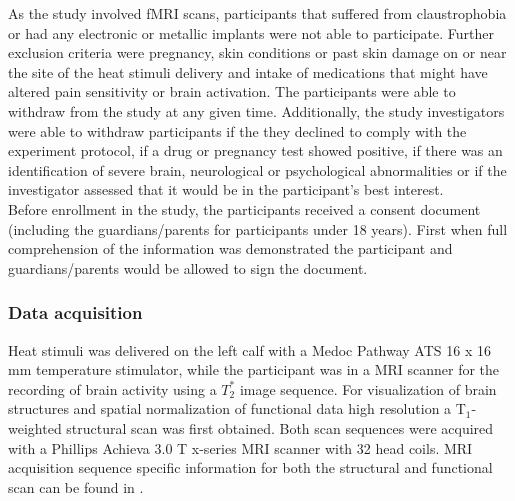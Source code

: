 As the study involved fMRI scans, participants that suffered from claustrophobia or had any electronic or metallic implants were not able to participate. Further exclusion criteria were pregnancy, skin conditions or past skin damage on or near the site of the heat stimuli delivery and intake of medications that might have altered pain sensitivity or brain activation. The participants were able to withdraw from the study at any given time. Additionally, the study investigators were able to withdraw participants if the they declined to comply with the experiment protocol, if a drug or pregnancy test showed positive, if there was an identification of severe brain, neurological or psychological abnormalities or if the investigator assessed that it would be in the participant's best interest. \\
Before enrollment in the study, the participants received a consent document (including the guardians/parents for participants under 18 years). First when full comprehension of the information was demonstrated the participant and guardians/parents would be allowed to sign the document.

\subsubsection{Data acquisition} \label{ac} 

Heat stimuli was delivered on the left calf with a Medoc Pathway ATS 16 x 16 mm temperature stimulator, while the participant was in a MRI scanner for the recording of brain activity using a $T_{2}^*$ image sequence. For visualization of brain structures and spatial normalization of functional data high resolution a T$_1$-weighted structural scan was first obtained. Both scan sequences were acquired with a Phillips Achieva 3.0 T x-series MRI scanner with 32 head coils. MRI acquisition sequence specific information for both the structural and functional scan can be found in .   

